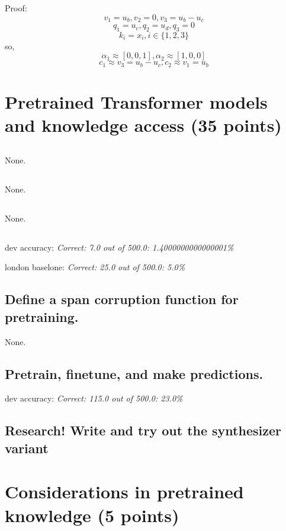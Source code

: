 \documentclass{homework}
\begin{document}
Proof:
$$
v_{1}=u_{b}, v_{2}=0, v_{3}=u_{b}-u_{c}
$$
$$
q_{1}=u_{c}, q_{2}=u_d, q_{3}=0
$$
$$
k_i=x_i, i\in \{1,2,3\}
$$
\quad so,
$$
\alpha_{1} \approx[0,0,1], \alpha_{2} \approx[1,0,0]
$$
$$
c_{1} \approx v_{3}=u_{b}-u_{c}, c_{2} \approx v_{1}=u_{b}
$$



\section{Pretrained Transformer models and knowledge access (35 points)}
\subsection{} None.
\subsection{} None.
\subsection{} None.
\subsection{}
dev accuracy: \textsl{Correct: 7.0 out of 500.0: 1.4000000000000001\%}

london baselone: \textsl{Correct: 25.0 out of 500.0: 5.0\%}

\subsection{Define a span corruption function for pretraining.}
None.

\subsection{Pretrain, finetune, and make predictions.}
dev accuracy: \textsl{Correct: 115.0 out of 500.0: 23.0\%}

\subsection{Research! Write and try out the synthesizer variant}


\section{Considerations in pretrained knowledge (5 points)}
\end{document}
